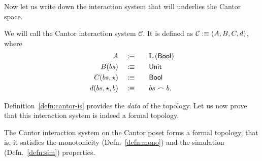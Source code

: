 Now let us write down the interaction system that will underlies the Cantor space.
\begin{defn}\label{defn:cantor-is}
  We will call the Cantor interaction system $\mathcal{C}$. It is defined as
  $\mathcal{C} :\equiv (A, B, C, d)$, where
  \begin{alignat*}{2}
    A           \quad&:\equiv\quad && \mathbb{L}\left(\mathsf{Bool}{}\right) \\
    B(bs)       \quad&:\equiv\quad && \mathsf{Unit}{} \\
    C(bs, \star)    \quad&:\equiv\quad && \mathsf{Bool}{}   \\
    d(bs, \star, b) \quad&:\equiv\quad && bs \frown b    .
  \end{alignat*}
\end{defn}

Definition~\ref{defn:cantor-is} provides the \emph{data} of the topology. Let us now prove
that this interaction system is indeed a formal topology.
\begin{thm}\label{thm:cantor-topo}
  The Cantor interaction system on the Cantor poset forms a formal topology, that is, it
  satisfies the monotonicity (Defn.~\ref{defn:mono}) and the simulation
  (Defn.~\ref{defn:sim}) properties.
\end{thm}
